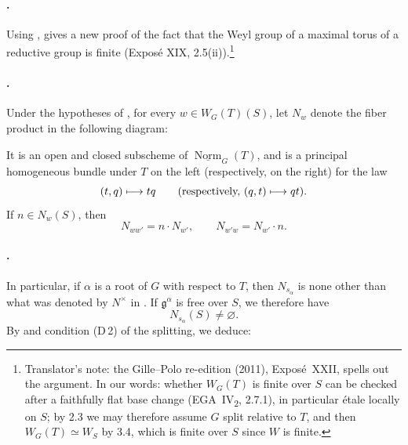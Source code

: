 \paragraph{.}
Using ,  gives a new proof of the fact
that the Weyl group of a maximal torus of a reductive group is finite
\textup{(Exposé XIX, 2.5(ii))}.\footnote{Translator's note: the Gille--Polo re-edition (2011), Exposé~XXII, spells out
the argument. In our words: whether \(W_G(T)\) is finite over \(S\) can be
checked after a faithfully flat base change (EGA~IV\textsubscript{2}, 2.7.1),
in particular étale locally on \(S\); by 2.3 we may therefore assume \(G\)
split relative to \(T\), and then \(W_G(T)\simeq W_S\) by 3.4, which is
finite over \(S\) since \(W\) is finite.}

\paragraph{.}
Under the hypotheses of , for every \(w\in W_G(T)(S)\), let
\(N_w\)
denote the fiber product in the following diagram:

\begin{center}
  
\end{center}

It is an open and closed subscheme of
\(\underline{\operatorname{Norm}}_G(T)\), and is a principal
homogeneous bundle under \(T\) on the left \textup{(respectively,
on the right)} for the law
\[
  (t,q)\longmapsto tq
  \qquad
  \textup{(respectively, \((q,t)\longmapsto qt\))}.
\]
If \(n\in N_w(S)\), then
\[
  N_{ww'}=n\mathbin{\cdot}N_{w'},
  \qquad
  N_{w'w}=N_{w'}\mathbin{\cdot}n.
\]

\paragraph{.}
In particular, if \(\alpha\) is a root of \(G\) with respect to
\(T\), then \(N_{s_\alpha}\) is none other than what was denoted by
\(N^\times\) in . If \(\mathfrak g^\alpha\) is free
over \(S\), we therefore have
\[
  N_{s_\alpha}(S)\ne\varnothing.
\]
By  and condition \textup{(D\,2)} of the splitting, we deduce:

